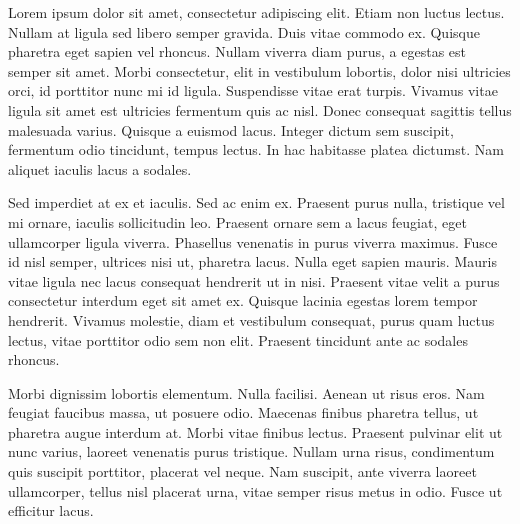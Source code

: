 


Lorem ipsum dolor sit amet, consectetur adipiscing elit. Etiam non luctus lectus. Nullam at ligula sed libero semper gravida. Duis vitae commodo ex. Quisque pharetra eget sapien vel rhoncus. Nullam viverra diam purus, a egestas est semper sit amet. Morbi consectetur, elit in vestibulum lobortis, dolor nisi ultricies orci, id porttitor nunc mi id ligula. Suspendisse vitae erat turpis. Vivamus vitae ligula sit amet est ultricies fermentum quis ac nisl. Donec consequat sagittis tellus malesuada varius. Quisque a euismod lacus. Integer dictum sem suscipit, fermentum odio tincidunt, tempus lectus. In hac habitasse platea dictumst. Nam aliquet iaculis lacus a sodales.

Sed imperdiet at ex et iaculis. Sed ac enim ex. Praesent purus nulla, tristique vel mi ornare, iaculis sollicitudin leo. Praesent ornare sem a lacus feugiat, eget ullamcorper ligula viverra. Phasellus venenatis in purus viverra maximus. Fusce id nisl semper, ultrices nisi ut, pharetra lacus. Nulla eget sapien mauris. Mauris vitae ligula nec lacus consequat hendrerit ut in nisi. Praesent vitae velit a purus consectetur interdum eget sit amet ex. Quisque lacinia egestas lorem tempor hendrerit. Vivamus molestie, diam et vestibulum consequat, purus quam luctus lectus, vitae porttitor odio sem non elit. Praesent tincidunt ante ac sodales rhoncus.

Morbi dignissim lobortis elementum. Nulla facilisi. Aenean ut risus eros. Nam feugiat faucibus massa, ut posuere odio. Maecenas finibus pharetra tellus, ut pharetra augue interdum at. Morbi vitae finibus lectus. Praesent pulvinar elit ut nunc varius, laoreet venenatis purus tristique. Nullam urna risus, condimentum quis suscipit porttitor, placerat vel neque. Nam suscipit, ante viverra laoreet ullamcorper, tellus nisl placerat urna, vitae semper risus metus in odio. Fusce ut efficitur lacus.